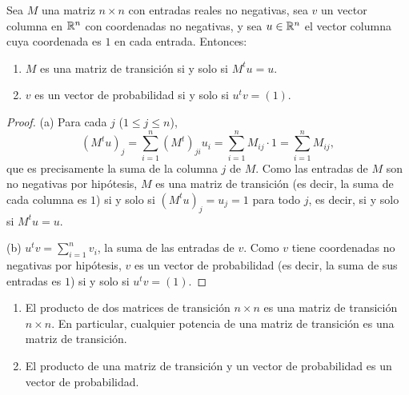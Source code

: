 \documentclass[12pt,a4paper]{book}
\begin{document}
    \begin{teorema}
        Sea $M$ una matriz $n\times n$ con entradas reales no negativas, sea $v$ un vector columna en $\mathbb{R}^n$ con coordenadas no negativas, y sea $u\in\mathbb{R}^n$ el vector columna cuya coordenada es $1$ en cada entrada. Entonces:
        \begin{enumerate}[label=(\alph*)]
            \item $M$ es una matriz de transición si y solo si $M^tu=u$.
            \item $v$ es un vector de probabilidad si y solo si $u^tv=(1)$.
        \end{enumerate}
    \end{teorema}

    \begin{proof}
        (a) Para cada $j$ ($1\leq j\leq n$),
        \begin{equation*}
            (M^tu)_j=\sum_{i=1}^{n}(M^t)_{ji}u_i=\sum_{i=1}^{n}M_{ij}\cdot 1=\sum_{i=1}^{n}M_{ij},
        \end{equation*}
        que es precisamente la suma de la columna $j$ de $M$. Como las entradas de $M$ son no negativas por hipótesis, $M$ es una matriz de transición (es decir, la suma de cada columna es $1$) si y solo si $(M^tu)_j=u_j=1$ para todo $j$, es decir, si y solo si $M^tu=u$.

        (b) $u^tv=\sum_{i=1}^{n}v_i$, la suma de las entradas de $v$. Como $v$ tiene coordenadas no negativas por hipótesis, $v$ es un vector de probabilidad (es decir, la suma de sus entradas es $1$) si y solo si $u^tv=(1)$.
    \end{proof}

    \begin{corolario}\leavevmode
        \begin{enumerate}[label=(\alph*)]
            \item El producto de dos matrices de transición $n\times n$ es una matriz de transición $n\times n$. En particular, cualquier potencia de una matriz de transición es una matriz de transición.
            \item El producto de una matriz de transición y un vector de probabilidad es un vector de probabilidad.
        \end{enumerate}
    \end{corolario}
\end{document}
